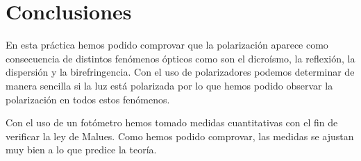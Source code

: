 \documentclass[12pt]{article}
\numberwithin{table}{section}
\numberwithin{figure}{section}
\numberwithin{equation}{section}
\begin{document}
\section{Conclusiones}
En esta práctica hemos podido comprovar que la polarización aparece como consecuencia de distintos fenómenos ópticos como son el dicroísmo, la reflexión, la dispersión y la birefringencia. Con el uso de polarizadores podemos determinar de manera sencilla si la luz está polarizada por lo que hemos podido observar la polarización en todos estos fenómenos.

Con el uso de un fotómetro hemos tomado medidas cuantitativas con el fin de verificar la ley de Malues. Como hemos podido comprovar, las medidas se ajustan muy bien a lo que predice la teoría.
\end{document}
